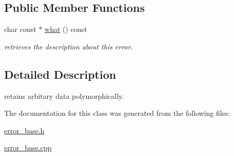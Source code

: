 \subsection*{Public Member Functions}
\begin{DoxyCompactItemize}
\item 
\hypertarget{classhryky_1_1error_1_1_base_ada15aa71a7243d03e8229fbcf4e6f295}{char const $\ast$ \hyperlink{classhryky_1_1error_1_1_base_ada15aa71a7243d03e8229fbcf4e6f295}{what} () const }\label{classhryky_1_1error_1_1_base_ada15aa71a7243d03e8229fbcf4e6f295}

\begin{DoxyCompactList}\small\item\em retrieves the description about this error. \end{DoxyCompactList}\end{DoxyCompactItemize}


\subsection{Detailed Description}
retains arbitary data polymorphically. 

The documentation for this class was generated from the following files\-:\begin{DoxyCompactItemize}
\item 
\hyperlink{error__base_8h}{error\-\_\-base.\-h}\item 
\hyperlink{error__base_8cpp}{error\-\_\-base.\-cpp}\end{DoxyCompactItemize}
